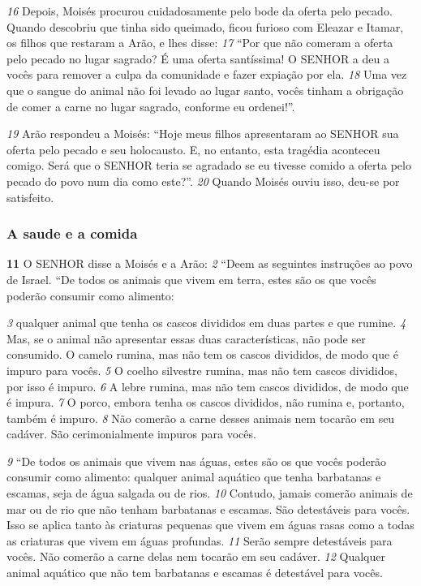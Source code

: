 \smallskip 
\textit{\tiny 16}
Depois, Moisés procurou cuidadosamente pelo bode da oferta pelo pecado.
Quando descobriu que tinha sido queimado, ficou furioso com Eleazar e Itamar,
os filhos que restaram a Arão, e lhes disse: 
\textit{\tiny 17}
“Por que não comeram a oferta pelo
pecado no lugar sagrado? É uma oferta santíssima! O SENHOR a deu a vocês para
remover a culpa da comunidade e fazer expiação por ela. 
\textit{\tiny 18}
Uma vez que o sangue
do animal não foi levado ao lugar santo, vocês tinham a obrigação de comer a
carne no lugar sagrado, conforme eu ordenei!”.

\smallskip 
\textit{\tiny 19}
Arão respondeu a Moisés: “Hoje meus filhos apresentaram ao SENHOR sua
oferta pelo pecado e seu holocausto. E, no entanto, esta tragédia aconteceu
comigo. Será que o SENHOR teria se agradado se eu tivesse comido a oferta pelo
pecado do povo num dia como este?”. 
\textit{\tiny 20}
Quando Moisés ouviu isso, deu-se por
satisfeito.
   
\bigskip
\subsubsection*{A saude e a comida}
\textbf{\large 11}
 O SENHOR disse a Moisés e a Arão: 
\textit{\tiny 2} 
“Deem as seguintes instruções ao povo
de Israel.
  “De todos os animais que vivem em terra,
 estes são os que vocês poderão
consumir como alimento: 

\smallskip 
\textit{\tiny 3} 
qualquer animal que tenha os cascos divididos em
duas partes e que rumine. 
\textit{\tiny 4} 
Mas, se o animal não apresentar essas duas
características, não pode ser consumido. O camelo rumina, mas não tem os cascos
divididos, de modo que é impuro para vocês. 
\textit{\tiny 5} 
O coelho silvestre
 rumina, mas
não tem cascos divididos, por isso é impuro. 
\textit{\tiny 6} 
A lebre rumina, mas não tem cascos
divididos, de modo que é impura. 
\textit{\tiny 7} 
O porco, embora tenha os cascos divididos,
não rumina e, portanto, também é impuro. 
\textit{\tiny 8} 
Não comerão a carne desses animais
nem tocarão em seu cadáver. São cerimonialmente impuros para vocês. 

\smallskip 
\textit{\tiny 9} 
“De todos os animais que vivem nas águas, estes são os que vocês poderão
consumir como alimento: qualquer animal aquático que tenha barbatanas e
escamas, seja de água salgada ou de rios. 
\textit{\tiny 10}
Contudo, jamais comerão animais de
mar ou de rio que não tenham barbatanas e escamas. São detestáveis para vocês.
Isso se aplica tanto às criaturas pequenas que vivem em águas rasas como a todas
as criaturas que vivem em águas profundas. 
\textit{\tiny 11}
Serão sempre detestáveis para
vocês. Não comerão a carne delas nem tocarão em seu cadáver. 
\textit{\tiny 12}
Qualquer
animal aquático que não tem barbatanas e escamas é detestável para vocês.

